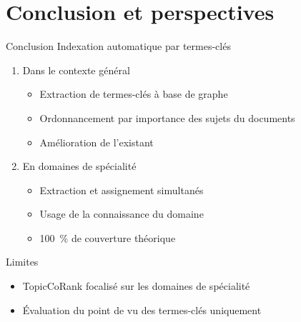 \section{Conclusion et perspectives}
%
%

  \begin{frame}{Conclusion}
    Indexation automatique par termes-clés
    \begin{enumerate}
      \item{Dans le contexte général}
      \begin{itemize}
        \item{Extraction de termes-clés à base de graphe}
        \item{Ordonnancement par importance des sujets du documents}
        \item{Amélioration de l'existant}
      \end{itemize}
      \item{En domaines de spécialité}
      \begin{itemize}
        \item{Extraction et assignement simultanés}
        \item{Usage de la connaissance du domaine}
        \item{100~\% de couverture théorique}
      \end{itemize}
    \end{enumerate}

    \vspace{1em}

    \begin{alertblock}{Limites}
      \begin{itemize}
        \item{TopicCoRank focalisé sur les domaines de spécialité}
        \item{Évaluation du point de vu des termes-clés uniquement}
      \end{itemize}
    \end{alertblock}    
  \end{frame}

